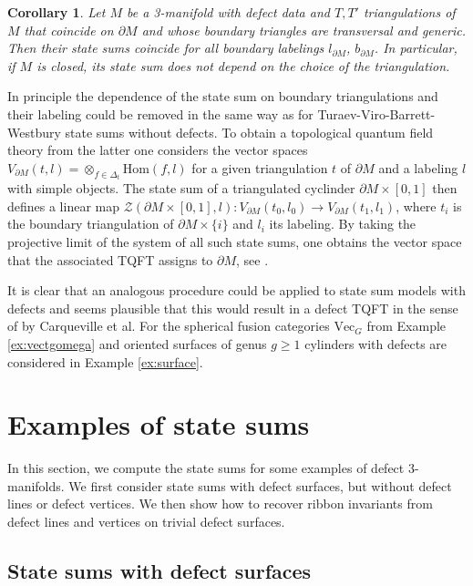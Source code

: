 \documentclass[1.5pt, a4paper]{article}
\newcommand{\Hom}{\mathrm{Hom}}
\newtheorem{corollary}[theorem]{Corollary}
\begin{document}
\begin{corollary}\label{cor:generalinvariant} Let $M$ be a 3-manifold with defect data and $T,T'$ triangulations of $M$ that coincide on $\partial M$ and whose boundary triangles are transversal and generic.
Then their state sums coincide for all boundary  labelings $l_{\partial M}$,  $b_{\partial M}$. 
In particular, if $M$ is closed, its state sum does not depend on the choice of the triangulation.
\end{corollary}

In principle the dependence  of the state sum on boundary triangulations  and their labeling could be removed in the same way as  for  Turaev-Viro-Barrett-Westbury state sums without defects.  To obtain a topological quantum field theory from the latter one considers 
the vector spaces $V_{\partial M}(t,l)=\otimes_{f\in \Delta_{t}} \Hom(f,l)$ for a given triangulation $t$ of $\partial M$ and a labeling $l$ with simple objects. The state sum of a triangulated cyclinder $\partial M\times[0,1]$  then defines a linear map $\mathcal Z(\partial M\times[0,1], l): V_{\partial M}(t_0,l_0)\to V_{\partial M}(t_1,l_1)$, where $t_i$ is the boundary triangulation of $\partial M\times \{i\}$ and $l_i$ its labeling. By taking the projective limit of the system of all such state sums, one obtains the vector space that the associated TQFT assigns to $\partial M$, see  \cite[Sec.~13.3.2]{TVbook}. 

It is clear that an analogous procedure could be applied to state sum models with defects and seems plausible that this would result in a defect TQFT in the sense of \cite{CMS,CRS} by Carqueville et al.  For the spherical fusion categories $\mathrm{Vec}_G$ from Example \ref{ex:vectgomega} and oriented surfaces of genus $g\geq 1$  cylinders with  defects are considered in Example \ref{ex:surface}.


\section{Examples of state sums}
\label{sec:examples}

In this section, we  compute the state sums for some examples of defect 3-manifolds. We first consider state sums with defect surfaces, but  without defect lines or defect vertices. We  then show how to recover ribbon invariants from defect lines and vertices on trivial defect surfaces.


\subsection{State sums with defect surfaces}
\end{document}
